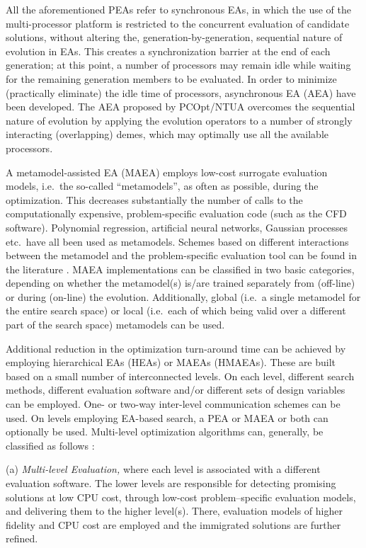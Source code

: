 All the aforementioned PEAs refer to synchronous EAs, in which the use of the multi-processor platform is restricted to the concurrent evaluation of candidate solutions, without altering the, generation-by-generation, sequential nature of evolution in EAs. This creates a synchronization barrier at the end of each generation; at this point, a number of processors may remain idle while waiting for the remaining generation members to be evaluated.  In order to minimize (practically eliminate) the idle time of processors, asynchronous EA (AEA) \cite{LTT_2_040,Alba2001} have been developed. The AEA proposed by PCOpt/NTUA overcomes the sequential nature of evolution by applying the evolution operators to a number of strongly interacting (overlapping) demes, which may optimally use all the available processors.     

A metamodel-assisted EA (MAEA) employs low-cost surrogate evaluation models, i.e.\ the so-called ``metamodels'', as often as possible, during the optimization. This decreases substantially the number of calls to the computationally expensive, problem-specific evaluation code (such as the CFD software). Polynomial regression, artificial neural networks, Gaussian processes etc.\ have all been used as metamodels. Schemes based on different interactions between the metamodel and the problem-specific evaluation tool can be found in the literature \cite{KEANEbook,LTT_2_020,Jin2002,LTT_2_027}. MAEA implementations can be classified in two basic categories, depending on whether the metamodel(s) is/are trained separately from (off-line) or during (on-line) the evolution. Additionally, global (i.e.\ a single metamodel for the entire search space) or local (i.e.\ each of which being valid over a different part of the search space) metamodels can be used.

Additional reduction in the optimization turn-around time can be achieved by employing hierarchical EAs (HEAs) or MAEAs (HMAEAs)\cite{phd_Karakasis,phd_Kampolis,Herr1999,LTT_2_044, LTT_2_031,Lim2007}. These are built based on a small number of interconnected levels. On each level, different search methods, different evaluation software and/or different sets of design variables can be employed. One- or two-way inter-level communication schemes can be used. On levels employing EA-based search, a PEA or MAEA or both can optionally be used. Multi-level optimization algorithms can, generally, be classified as follows \cite{ParCFD}:

(a) \emph{Multi-level Evaluation,} where each level is associated with
a different evaluation software. The lower levels are responsible
for detecting promising solutions  at low CPU cost, through low-cost problem--specific evaluation models, and
delivering them to the higher level(s). There, evaluation models of
higher fidelity and CPU cost are employed and the immigrated
solutions are further refined. 

